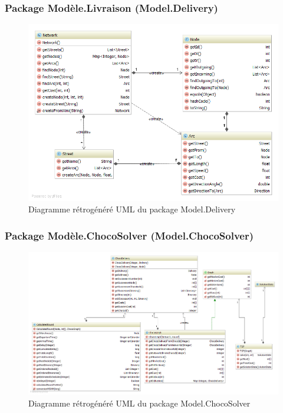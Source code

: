 \subsubsection{Package Mod\`ele.Livraison (Model.Delivery)}

\begin{figure}[h]
    \centering
    \includegraphics[width=160mm]{../diagrams/classes_packages/final_classes_packages/model/delivery.png}
    \caption{Diagramme r\'etrog\'en\'er\'e UML du package Model.Delivery}
    \label{diagram:gen_uml_model_delivery}
\end{figure}
\pagebreak

\begin{landscape}
\subsubsection{Package Mod\`ele.ChocoSolver (Model.ChocoSolver)}

\begin{figure}[h]
    \centering
    \includegraphics[width=200mm]{../diagrams/classes_packages/final_classes_packages/model/chocoSolver.png}
    \caption{Diagramme r\'etrog\'en\'er\'e UML du package Model.ChocoSolver}
    \label{diagram:gen_uml_model_choco}
\end{figure}
\end{landscape}
\pagebreak

